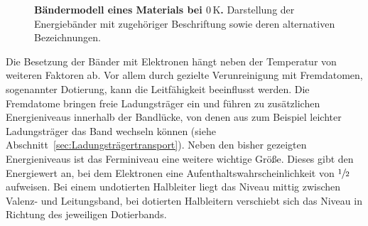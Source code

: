 {%
\begin{figure}[H]
    \centering
    
    \caption{\textbf{Bändermodell eines Materials bei $0\,\mathrm{K}$.} Darstellung der Energiebänder mit zugehöriger 
    Beschriftung sowie deren alternativen Bezeichnungen.}  
    \label{fig:BandermodellEinesMaterialsBei0K}
\end{figure}

%

Die Besetzung der Bänder mit Elektronen hängt neben der Temperatur von weiteren Faktoren ab. Vor allem durch gezielte Verunreinigung mit Fremdatomen, sogenannter Dotierung, 
kann die Leitfähigkeit beeinflusst werden. Die Fremdatome bringen freie Ladungsträger ein und führen zu zusätzlichen Energieniveaus innerhalb der Bandlücke, von denen aus 
zum Beispiel leichter Ladungsträger das Band wechseln können (siehe Abschnitt~\ref{sec:Ladungsträgertransport}). Neben den bisher gezeigten Energieniveaus ist das Ferminiveau eine weitere wichtige Größe. 
Dieses gibt den Energiewert an, bei dem Elektronen eine Aufenthaltswahrscheinlichkeit von $\sfrac{1}{2}$ aufweisen. Bei einem undotierten Halbleiter liegt das Niveau mittig zwischen 
Valenz- und Leitungsband, bei dotierten Halbleitern verschiebt sich das Niveau in Richtung des jeweiligen Dotierbands.
}


